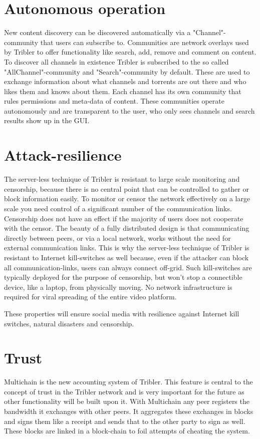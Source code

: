 \section{Autonomous operation}

New content discovery can be discovered automatically via a "Channel"-community that users can subscribe to.
Communities are network overlays used by Tribler to offer functionality like search, add, remove and comment on content.
To discover all channels in existence Tribler is subscribed to the so called "AllChannel"-community and "Search"-community by default.
These are used to exchange information about what channels and torrents are out there and who likes them and knows about them.
Each channel has its own community that rules permissions and meta-data of content.
These communities operate autonomously and are transparent to the user, who only sees channels and search results show up in the GUI.


\section{Attack-resilience}

The server-less technique of Tribler is resistant to large scale monitoring and censorship, because there is no central point that can be controlled to gather or block information easily.
To monitor or censor the network effectively on a large scale you need control of a significant number of the communication links.
Censorship does not have an effect if the majority of users does not cooperate with the censor.
The beauty of a fully distributed design is that communicating directly between peers, or via a local network, works without the need for external communication links.
This is why the server-less technique of Tribler is resistant to Internet kill-switches as well because, even if the attacker can block all communication-links, users can always connect off-grid.
Such kill-switches are typically deployed for the purpose of censorship, but won't stop a connectible device, like a laptop, from physically moving.
No network infrastructure is required for viral spreading of the entire video platform.

These properties will ensure social media with resilience against Internet kill switches, natural disasters and censorship.


\section{Trust}
Multichain is the new accounting system of Tribler.
This feature is central to the concept of trust in the Tribler network and is very important for the future as other functionality will be built upon it.
With Multichain any peer registers the bandwidth it exchanges with other peers.
It aggregates these exchanges in blocks and signs them like a receipt and sends that to the other party to sign as well.
These blocks are linked in a block-chain to foil attempts of cheating the system.

